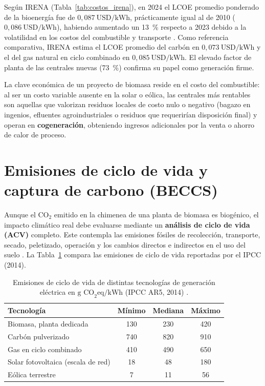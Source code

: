 Según IRENA (Tabla~\ref{tab:costos_irena}), en 2024 el LCOE promedio ponderado de la bioenergía fue de $0{,}087~\text{USD/kWh}$, prácticamente igual al de 2010 ($0{,}086~\text{USD/kWh}$), habiendo aumentado un 13~\% respecto a 2023 debido a la volatilidad en los costos del combustible y transporte \cite{irena2025costs}. Como referencia comparativa, IRENA estima el LCOE promedio del carbón en $0{,}073~\text{USD/kWh}$ y el del gas natural en ciclo combinado en $0{,}085~\text{USD/kWh}$. El elevado factor de planta de las centrales nuevas (73~\%) confirma su papel como generación firme.

La clave económica de un proyecto de biomasa reside en el costo del combustible: al ser un costo variable ausente en la solar o eólica, las centrales más rentables son aquellas que valorizan residuos locales de costo nulo o negativo (bagazo en ingenios, efluentes agroindustriales o residuos que requerirían disposición final) y operan en \textbf{cogeneración}, obteniendo ingresos adicionales por la venta o ahorro de calor de proceso.

\section{Emisiones de ciclo de vida y captura de carbono (BECCS)}
\label{sec:emisiones_beccs}

Aunque el $\mathrm{CO_2}$ emitido en la chimenea de una planta de biomasa es biogénico, el impacto climático real debe evaluarse mediante un \textbf{análisis de ciclo de vida (ACV)} completo. Este contempla las emisiones fósiles de recolección, transporte, secado, peletizado, operación y los cambios directos e indirectos en el uso del suelo \cite{chum2011ipcc, schlomer2014ipcc}. La Tabla~\ref{tab:emisiones_acv} compara las emisiones de ciclo de vida reportadas por el IPCC (2014).

\begin{table}[htbp]
\centering
\caption{Emisiones de ciclo de vida de distintas tecnologías de generación eléctrica en $\text{g CO}_2\text{eq/kWh}$ (IPCC AR5, 2014) \cite{schlomer2014ipcc}.}
\label{tab:emisiones_acv}
\begin{tabular}{@{}lccc@{}}
\toprule
\textbf{Tecnología} & \textbf{Mínimo} & \textbf{Mediana} & \textbf{Máximo} \\
\midrule
Biomasa, planta dedicada & 130 & 230 & 420 \\
Carbón pulverizado & 740 & 820 & 910 \\
Gas en ciclo combinado & 410 & 490 & 650 \\
Solar fotovoltaica (escala de red) & 18 & 48 & 180 \\
Eólica terrestre & 7 & 11 & 56 \\
\bottomrule
\end{tabular}
\end{table}


